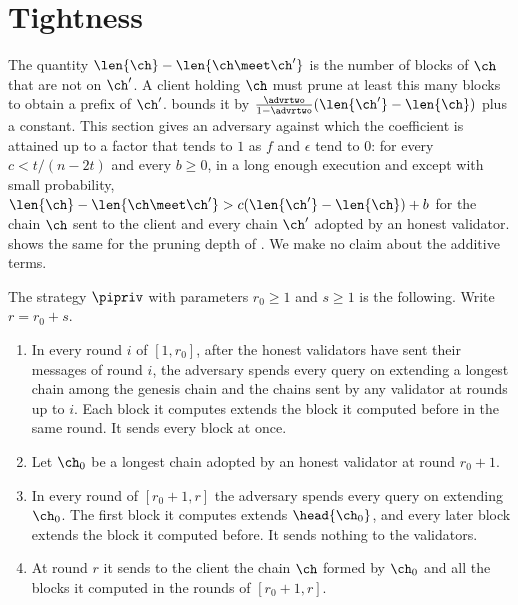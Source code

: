 \section{Tightness}
\label{sec.tightness}

The quantity $\len{\ch}-\len{\ch\meet\ch'}$ is the number of blocks of $\ch$
that are not on $\ch'$. A client holding $\ch$ must prune at least this many
blocks to obtain a prefix of $\ch'$.  bounds it by
$\frac{\advrtwo}{1-\advrtwo}(\len{\ch'}-\len{\ch})$ plus a constant. This
section gives an adversary against which the coefficient is attained up to a
factor that tends to $1$ as $f$ and $\epsilon$ tend to $0$: for every
$c<t/(n-2t)$ and every $b\ge0$, in a long enough execution and except with
small probability, $\len{\ch}-\len{\ch\meet\ch'}>c(\len{\ch'}-\len{\ch})+b$
for the chain $\ch$ sent to the client and every chain $\ch'$ adopted by an
honest validator.  shows the same for the pruning
depth of . We make no claim about the additive terms.

\begin{definition}\label{def.private}
    The strategy $\pipriv$ with parameters $r_0\ge1$ and $s\ge1$ is the
    following. Write $r=r_0+s$.
    \begin{enumerate}
        \item In every round $i$ of $[1,r_0]$, after the honest validators
            have sent their messages of round $i$, the adversary spends every
            query on extending a longest chain among the genesis chain and
            the chains sent by any validator at rounds up to $i$. Each block
            it computes extends the block it computed before in the same
            round. It sends every block at once.
        \item Let $\ch_0$ be a longest chain adopted by an honest validator at
            round $r_0+1$.
        \item In every round of $[r_0+1,r]$ the adversary spends every query
            on extending $\ch_0$. The first block it computes extends
            $\head{\ch_0}$, and every later block extends the block it
            computed before. It sends nothing to the validators.
        \item At round $r$ it sends to the client the chain $\ch$ formed by
            $\ch_0$ and all the blocks it computed in the rounds of
            $[r_0+1,r]$.
    \end{enumerate}
\end{definition}

